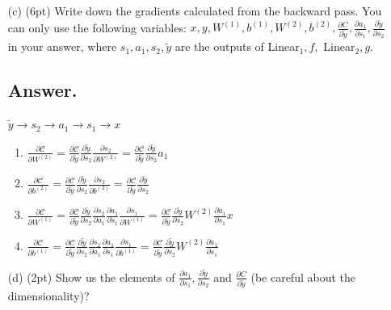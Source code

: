 \documentclass{article}
\begin{document}
\begin{itemize}
    
    \item[(c)] (6pt) Write down the gradients calculated from the backward pass. You can only use the following variables: $x, y, W^{(1)}, b^{(1)}, W^{(2)}, b^{(2)}, \frac{\partial C}{\partial \tilde{y}}, \frac{\partial a_1}{\partial s_1}, \frac{\partial \tilde{y}}{\partial s_2}$ in your answer, where $s_1, a_1, s_2, \tilde{y}$ are the outputs of Linear$_1, f, $ Linear$_2, g$.

     \subsection*{Answer.}
      $\tilde{y} \rightarrow s_2 \rightarrow a_1 \rightarrow s_1 \rightarrow x$
     \begin{enumerate} 
     \item \(\frac{\partial \mathcal{C}}{\partial W^{(2)}} = \frac{\partial \mathcal{C}}{\partial \tilde{y}} \frac{\partial \tilde{y}}{\partial s_{2}} \frac{\partial s_{2}}{\partial W^{(2)}} = \frac{\partial \mathcal{C}}{\partial \tilde{y}} \frac{\partial \tilde{y}}{\partial s_{2}} a_1 \)
    \item \(\frac{\partial \mathcal{C}}{\partial b^{(2)}} = \frac{\partial \mathcal{C}}{\partial \tilde{y}} \frac{\partial \tilde{y}}{\partial s_{2}} \frac{\partial s_{2}}{\partial b^{(2)}} = \frac{\partial \mathcal{C}}{\partial \tilde{y}} \frac{\partial \tilde{y}}{\partial s_{2}}\)
    \item \(\frac{\partial \mathcal{C}}{\partial W^{(1)}} = \frac{\partial \mathcal{C}}{\partial \tilde{y}} \frac{\partial \tilde{y}}{\partial s_{2}} \frac{\partial s_{2}}{\partial a_{1}} \frac{\partial a_{1}}{\partial s_{1}} \frac{\partial s_{1}}{\partial W^{(1)}} =  \frac{\partial \mathcal{C}}{\partial \tilde{y}} \frac{\partial \tilde{y}}{\partial s_{2}} W^{(2)} \frac{\partial a_{1}}{\partial s_{1}} x \)

    
    \item \(\frac{\partial \mathcal{C}}{\partial b^{(1)}} = \frac{\partial \mathcal{C}}{\partial \tilde{y}} \frac{\partial \tilde{y}}{\partial s_{2}} \frac{\partial s_{2}}{\partial a_{1}} \frac{\partial a_{1}}{\partial s_{1}} \frac{\partial s_{1}}{\partial b^{(1)}} = \frac{\partial \mathcal{C}}{\partial \tilde{y}} \frac{\partial \tilde{y}}{\partial s_{2}} W^{(2)} \frac{\partial a_1}{\partial s_{1}} \)
     \end{enumerate}
        
    
    \item[(d)] (2pt) Show us the elements of $\frac{\partial a_1}{\partial s_1}, \frac{\partial \tilde{y}}{\partial s_2}$ and $\frac{\partial C}{\partial \tilde{y}}$ (be careful about the dimensionality)?

\end{itemize}
\end{document}
